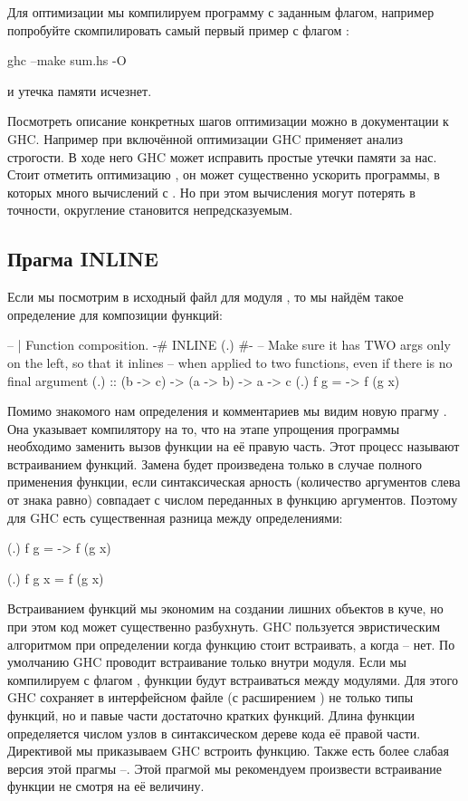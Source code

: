 Для оптимизации мы компилируем программу с заданным флагом, например
попробуйте скомпилировать самый первый пример с флагом :


\begin{code}
ghc --make sum.hs -O 
\end{code}

\noindent 

и утечка памяти исчезнет.

Посмотреть описание конкретных шагов оптимизации можно в документации к
GHC. Например при включённой оптимизации GHC применяет анализ строгости.
В ходе него GHC может исправить простые утечки памяти за нас. Стоит
отметить оптимизацию , он может существенно
ускорить программы, в которых много вычислений с . Но при
этом вычисления могут потерять в точности, округление становится
непредсказуемым.

\subsection{Прагма INLINE}

Если мы посмотрим в исходный файл для модуля , то мы найдём
такое определение для композиции функций:


\begin{code}
-- | Function composition.
{-# INLINE (.) #-}
-- Make sure it has TWO args only on the left, so that it inlines
-- when applied to two functions, even if there is no final argument
(.)    :: (b -> c) -> (a -> b) -> a -> c
(.) f g = \x -> f (g x)
\end{code}

Помимо знакомого нам определения и комментариев мы видим новую прагму
. Она указывает компилятору на то, что на этапе упрощения
программы необходимо заменить вызов функции на её правую часть. Этот
процесс называют встраиванием функций. Замена будет произведена только в
случае полного применения функции, если синтаксическая арность
(количество аргументов слева от знака равно) совпадает с числом
переданных в функцию аргументов. Поэтому для GHC есть существенная
разница между определениями:


\begin{code}
(.) f g = \x -> f (g x)

(.) f g x = f (g x)
\end{code}

Встраиванием функций мы экономим на создании лишних объектов в куче, но
при этом код может существенно разбухнуть. GHC пользуется эвристическим
алгоритмом при определении когда функцию стоит встраивать, а когда --
нет. По умолчанию GHC проводит встраивание только внутри модуля. Если мы
компилируем с флагом , функции будут встраиваться между модулями.
Для этого GHC сохраняет в интерфейсном файле (с расширением ) не
только типы функций, но и павые части достаточно кратких функций. Длина
функции определяется числом узлов в синтаксическом дереве кода её правой
части. Директивой  мы приказываем GHC встроить функцию. Также
есть более слабая версия этой прагмы --. Этой прагмой мы
рекомендуем произвести встраивание функции не смотря на её величину.

